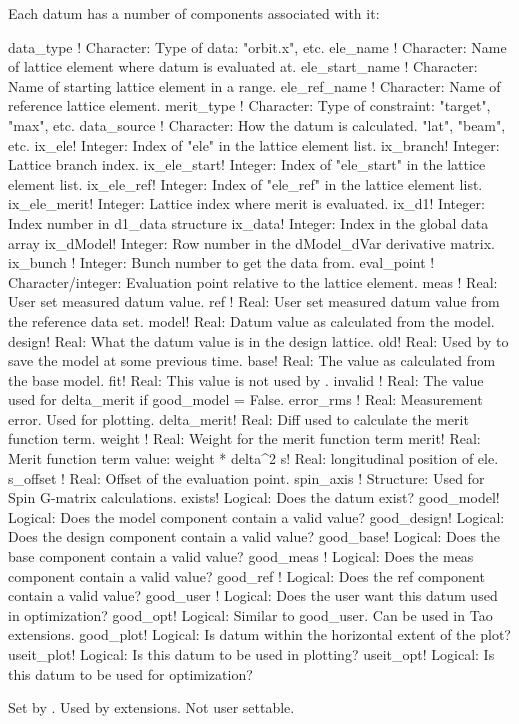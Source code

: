 Each datum has a number of components associated with it:
\begin{example}
  data_type       ! Character: Type of data: "orbit.x", etc.
  ele_name        ! Character: Name of lattice element where datum is evaluated at.
  ele_start_name  ! Character: Name of starting lattice element in a range.
  ele_ref_name    ! Character: Name of reference lattice element.
  merit_type      ! Character: Type of constraint: "target", "max", etc.
  data_source     ! Character: How the datum is calculated. "lat", "beam", etc.
  ix_ele\Ss         ! Integer: Index of "ele" in the lattice element list.
  ix_branch\Ss      ! Integer: Lattice branch index.
  ix_ele_start\Ss   ! Integer: Index of "ele_start" in the lattice element list.
  ix_ele_ref\Ss     ! Integer: Index of "ele_ref" in the lattice element list.
  ix_ele_merit\Ss   ! Integer: Lattice index where merit is evaluated.
  ix_d1\Ss          ! Integer: Index number in d1_data structure
  ix_data\Ss        ! Integer: Index in the global data array
  ix_dModel\Ss      ! Integer: Row number in the dModel_dVar derivative matrix.
  ix_bunch        ! Integer: Bunch number to get the data from.
  eval_point      ! Character/integer: Evaluation point relative to the lattice element.
  meas            ! Real: User set measured datum value.
  ref             ! Real: User set measured datum value from the reference data set.
  model\Ss          ! Real: Datum value as calculated from the model.
  design\Ss         ! Real: What the datum value is in the design lattice.
  old\Ss            ! Real: Used by \tao to save the model at some previous time.
  base\Ss           ! Real: The value as calculated from the base model.
  fit\Dd            ! Real: This value is not used by \tao.
  invalid         ! Real: The value used for delta_merit if good_model = False.
  error_rms       ! Real: Measurement error. Used for plotting.
  delta_merit\Ss    ! Real: Diff used to calculate the merit function term.
  weight          ! Real: Weight for the merit function term
  merit\Ss          ! Real: Merit function term value: weight * delta^2
  s\Ss              ! Real: longitudinal position of ele.
  s_offset        ! Real: Offset of the evaluation point.
  spin_axis       ! Structure: Used for Spin G-matrix calculations.
  exists\Ss         ! Logical: Does the datum exist?
  good_model\Ss     ! Logical: Does the model  component contain a valid value?
  good_design\Ss    ! Logical: Does the design component contain a valid value?
  good_base\Ss      ! Logical: Does the base   component contain a valid value?
  good_meas       ! Logical: Does the meas   component contain a valid value?
  good_ref        ! Logical: Does the ref    component contain a valid value?
  good_user       ! Logical: Does the user want this datum used in optimization?
  good_opt\Dd       ! Logical: Similar to good_user. Can be used in Tao extensions.
  good_plot\Dd      ! Logical: Is datum within the horizontal extent of the plot?
  useit_plot\Ss     ! Logical: Is this datum to be used in plotting?
  useit_opt\Ss      ! Logical: Is this datum to be used for optimization?
\end{example}
\Ss Set by \tao. \Dd Used by \tao extensions. Not user settable.

